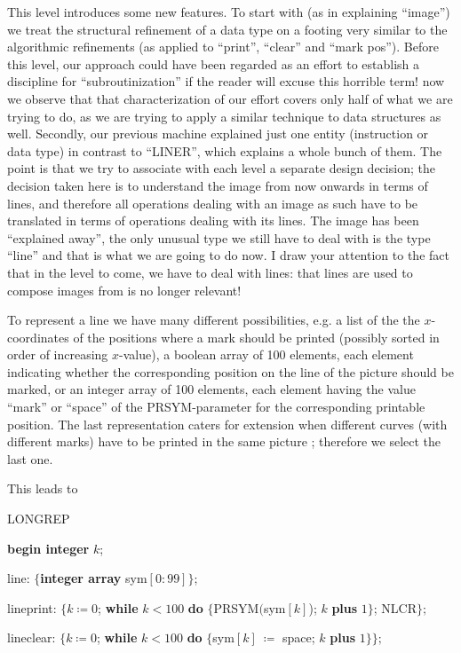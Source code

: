 This level introduces some new features. To start with (as in explaining ``image'') we treat the structural refinement of a data type on a footing very similar to the algorithmic refinements (as applied to ``print'', ``clear'' and ``mark pos''). Before this level, our approach could have been regarded as an effort to establish a discipline for ``subroutinization'' \textemdash{}  if the reader will excuse this horrible term! \textemdash{}  now we observe that that characterization of  our effort covers only half of what we are trying to do, as we are trying to apply a similar technique to data structures as well. Secondly, our previous machine explained just one entity (instruction or data type) in contrast to ``LINER'', which explains a whole bunch of them. The point is that we try to associate with each level a separate design decision; the decision taken here is to understand the image from now onwards in terms of lines, and therefore all operations dealing with an image as such have to be translated in terms of operations dealing with its lines. The image has been ``explained away'', the only unusual type we still have to deal with is the type ``line'' and that is what we are going to do now. I draw your attention to the fact that in the level to come, we have to deal with lines: that lines are used to compose images from is no longer relevant!

To represent a line we have many different possibilities, e.g. a list of the the $x$-coordinates of the positions where a mark should be printed (possibly sorted in order of increasing $x$-value), a boolean array of 100 elements, each element indicating whether the corresponding position on the line of the picture should be marked, or an integer array of 100 elements, each element having the value ``mark'' or ``space'' of the PRSYM-parameter for the corresponding printable position. The last representation caters for extension when different curves (with different marks) have to be printed in the same picture ; therefore we select the last one.

This leads to

\noindent
LONGREP

\noindent
\textbf{begin integer} $k$;

\noindent
\quad line: $\{$\textbf{integer array} sym$[0 : 99]\}$;

\noindent
\quad lineprint: $\{k \coloneq 0$; \textbf{while} $k < 100$ \textbf{do} $\{$PRSYM$($sym$[k]$); $k$ \textbf{plus} $1\}$; NLCR$\};$

\noindent
\quad lineclear: $\{k \coloneq 0$; \textbf{while} $k < 100$ \textbf{do} $\{$sym$[k]\ \coloneq$ space; $k$ \textbf{plus} $1\}\};$


